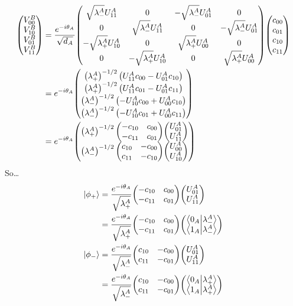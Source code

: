 \documentclass[12pt]{article}
\begin{document}
\begin{align*}
    \mqty(V_{00}^B \\ V_{10}^B \\ V_{01}^B \\ V_{11}^B) &= \frac{e^{-i\theta_A}}{\sqrt{d_A}}\mqty(\sqrt{\lambda_-^A}U_{11}^A & 0 & -\sqrt{\lambda_-^A}U_{01}^A & 0 \\ 0 & \sqrt{\lambda_-^A}U_{11}^A & 0 & -\sqrt{\lambda_-^A}U_{01}^A \\ -\sqrt{\lambda_+^A}U_{10}^A & 0 & \sqrt{\lambda_+^A}U_{00}^A & 0 \\ 0 & -\sqrt{\lambda_+^A}U_{10}^A & 0 & \sqrt{\lambda_+^A}U_{00}^A) \mqty(c_{00}\\c_{01}\\c_{10}\\c_{11}) \\
    &= e^{-i\theta_A}\mqty(\left(\lambda_+^A\right)^{-1/2}\left(U_{11}^Ac_{00} - U_{01}^Ac_{10}\right) \\ \left(\lambda_+^A\right)^{-1/2}\left(U_{11}^Ac_{01} - U_{01}^Ac_{11}\right) \\ \left(\lambda_-^A\right)^{-1/2}\left(-U_{10}^Ac_{00} + U_{00}^Ac_{10}\right) \\ \left(\lambda_-^A\right)^{-1/2}\left(-U_{10}^Ac_{01} + U_{00}^Ac_{11}\right)) \\
    &= e^{-i\theta_A}\mqty(\left(\lambda_+^A\right)^{-1/2}\mqty(-c_{10} & c_{00} \\ -c_{11} & c_{01})\mqty(U_{01}^A\\U_{11}^A) \\ \left(\lambda_-^A\right)^{-1/2}\mqty(c_{10} & -c_{00} \\ c_{11} & -c_{10})\mqty(U_{00}^A\\U_{10}^A))
\end{align*}
So\dots
\begin{align*}
    \ket{\phi_+} &= \frac{e^{-i\theta_A}}{\sqrt{\lambda_+^A}}\mqty(-c_{10} & c_{00} \\ -c_{11} & c_{01})\mqty(U_{01}^A\\U_{11}^A) \\
    &= \frac{e^{-i\theta_A}}{\sqrt{\lambda_+^A}}\mqty(-c_{10} & c_{00} \\ -c_{11} & c_{01})\mqty(\braket{0_A}{\lambda_-^A}\\\braket{1_A}{\lambda_-^A}) \\
    \ket{\phi_-} &= \frac{e^{-i\theta_A}}{\sqrt{\lambda_-^A}}\mqty(c_{10} & -c_{00} \\ c_{11} & -c_{01})\mqty(U_{01}^A\\U_{11}^A) \\
    &= \frac{e^{-i\theta_A}}{\sqrt{\lambda_-^A}}\mqty(c_{10} & -c_{00} \\ c_{11} & -c_{01})\mqty(\braket{0_A}{\lambda_+^A}\\\braket{1_A}{\lambda_+^A}) \\
\end{align*}
\end{document}
